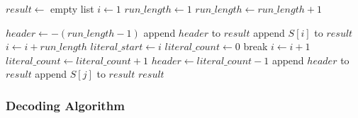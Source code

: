 \begin{algorithm}[H]
\caption{PackBits Encoding}
\begin{algorithmic}[1]
    \State $result \gets$ empty list
    \State $i \gets 1$
        \State $run\_length \gets 1$
            \State $run\_length \gets run\_length + 1$
        \EndWhile
        
         
            \State $header \gets -(run\_length - 1)$ 
            \State append $header$ to $result$
            \State append $S[i]$ to $result$
            \State $i \gets i + run\_length$
        \Else {}
            \State $literal\_start \gets i$
            \State $literal\_count \gets 0$
                \State {}
                    \State break 
                \EndIf
                \State $i \gets i + 1$
                \State $literal\_count \gets literal\_count + 1$
            \EndWhile
            \State $header \gets literal\_count - 1$ 
            \State append $header$ to $result$
                \State append $S[j]$ to $result$
            \EndFor
        \EndIf
    \EndWhile
    \State \Return $result$
\EndProcedure
\end{algorithmic}
\end{algorithm}

\subsubsection{Decoding Algorithm}

